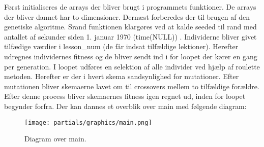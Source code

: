 Først initialiseres de arrays der bliver brugt i programmets funktioner. De arrays der bliver dannet har to dimensioner.
Dernæst forberedes der til brugen af den genetiske algoritme. Srand funktionen klargøres ved at kalde seeded til rand med antallet af sekunder siden 1. januar 1970 (time(NULL)) . Individerne bliver givet tilfædige værdier i lesson\_num (de får indsat tilfældige lektioner). Herefter udregnes individernes fitness og de bliver sendt ind i for loopet der kører en gang per generation. I loopet udføres en selektion af alle individer ved hjælp af roulette metoden. Herefter er der i hvert skema sandsynlighed for mutationer. Efter mutationen bliver skemaerne lavet om til crossovers mellem to tilfældige forældre. Efter denne process bliver skemaernes fitness igen regnet ud, inden for loopet begynder forfra. Der kan dannes et overblik over main med følgende diagram:
\begin{figure}[!h]
  \centering
  \texttt{[image: partials/graphics/main.png]}
  \caption{Diagram over main.}
  \label{fig:main}
\end{figure}
